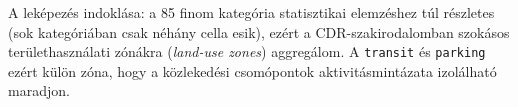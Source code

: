 A leképezés indoklása: a 85 finom kategória statisztikai elemzéshez túl részletes (sok kategóriában csak néhány cella esik), ezért a CDR-szakirodalomban szokásos területhasználati zónákra (\textit{land-use zones}) aggregálom. A \texttt{transit} és \texttt{parking} ezért külön zóna, hogy a közlekedési csomópontok aktivitásmintázata izolálható maradjon.
